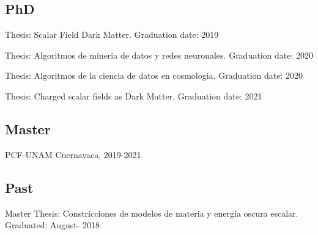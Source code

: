 \documentclass[12pt,a4paper]{moderncv}
\begin{document}
\subsection{PhD}
\vspace{0.5em}	

 		{Thesis: Scalar Field Dark Matter. \hfill Graduation date: 2019} 

\vspace{1.0em}	
 		{Thesis: Algoritmos de mineria de datos y redes neuronales. \hfill Graduation date: 2020} 
		
\vspace{1.em}	
 		{Thesis: Algoritmos de la ciencia de datos en cosmologia. \hfill Graduation date: 2020} 
		
		
\vspace{1.em}	
 		{ Thesis: Charged scalar fields as Dark Matter. \hfill Graduation date: 2021 }  

\vspace{1.0em}
\subsection{Master}
\vspace{0.5em}
 

 		{PCF-UNAM Cuernavaca, \hfill  2019-2021}  

\vspace{1.0em}
\subsection{Past}
\vspace{0.5em}

 		{Master Thesis: Constricciones de modelos de materia y energ\'ia oscura escalar. \\ 
		 Graduated: August- 2018 }  
\end{document}
